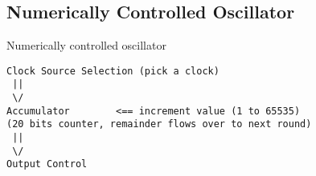 \subsection*{Numerically Controlled Oscillator}
Numerically controlled oscillator

\begin{lstlisting}
Clock Source Selection (pick a clock)
 ||
 \/
Accumulator        <== increment value (1 to 65535)
(20 bits counter, remainder flows over to next round)
 ||
 \/
Output Control
\end{lstlisting}
